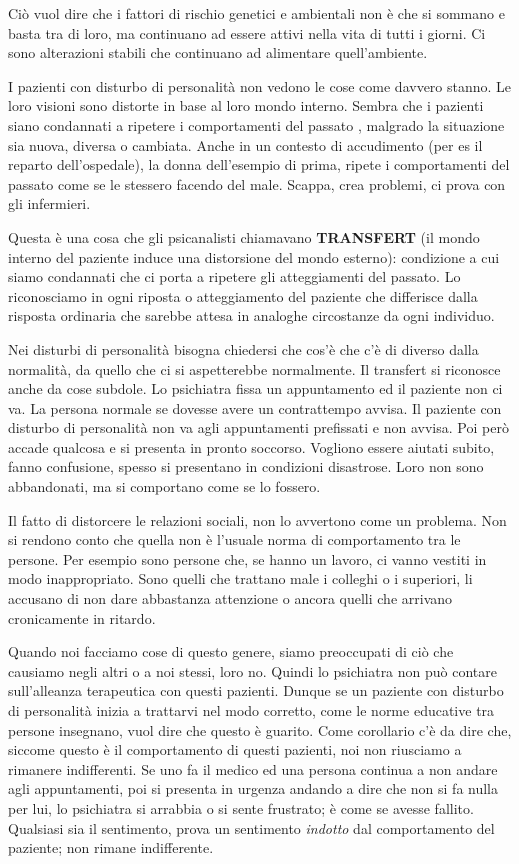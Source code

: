 Ciò vuol dire che i fattori di rischio genetici e ambientali non è che
si sommano e basta tra di loro, ma continuano ad essere attivi nella
vita di tutti i giorni. Ci sono alterazioni stabili che continuano ad
alimentare quell'ambiente.

I pazienti con disturbo di personalità non vedono le cose come davvero
stanno. Le loro visioni sono distorte in base al loro mondo interno.
Sembra che i pazienti siano condannati a ripetere i comportamenti del
passato , malgrado la situazione sia nuova, diversa o cambiata. Anche in
un contesto di accudimento (per es il reparto dell'ospedale), la donna
dell'esempio di prima, ripete i comportamenti del passato come se le
stessero facendo del male. Scappa, crea problemi, ci prova con gli
infermieri.

Questa è una cosa che gli psicanalisti chiamavano \textbf{TRANSFERT} (il
mondo interno del paziente induce una distorsione del mondo esterno):
condizione a cui siamo condannati che ci porta a ripetere gli
atteggiamenti del passato. Lo riconosciamo in ogni riposta o
atteggiamento del paziente che differisce dalla risposta ordinaria che
sarebbe attesa in analoghe circostanze da ogni individuo.

Nei disturbi di personalità bisogna chiedersi che cos'è che c'è di
diverso dalla normalità, da quello che ci si aspetterebbe normalmente.
Il transfert si riconosce anche da cose subdole. Lo psichiatra fissa un
appuntamento ed il paziente non ci va. La persona normale se dovesse
avere un contrattempo avvisa. Il paziente con disturbo di personalità
non va agli appuntamenti prefissati e non avvisa. Poi però accade
qualcosa e si presenta in pronto soccorso. Vogliono essere aiutati
subito, fanno confusione, spesso si presentano in condizioni disastrose.
Loro non sono abbandonati, ma si comportano come se lo fossero.

Il fatto di distorcere le relazioni sociali, non lo avvertono come un
problema. Non si rendono conto che quella non è l'usuale norma di
comportamento tra le persone. Per esempio sono persone che, se hanno un
lavoro, ci vanno vestiti in modo inappropriato. Sono quelli che trattano
male i colleghi o i superiori, li accusano di non dare abbastanza
attenzione o ancora quelli che arrivano cronicamente in ritardo.

Quando noi facciamo cose di questo genere, siamo preoccupati di ciò che
causiamo negli altri o a noi stessi, loro no. Quindi lo psichiatra non
può contare sull'alleanza terapeutica con questi pazienti. Dunque se un
paziente con disturbo di personalità inizia a trattarvi nel modo
corretto, come le norme educative tra persone insegnano, vuol dire che
questo è guarito. Come corollario c'è da dire che, siccome questo è il
comportamento di questi pazienti, noi non riusciamo a rimanere
indifferenti. Se uno fa il medico ed una persona continua a non andare
agli appuntamenti, poi si presenta in urgenza andando a dire che non si
fa nulla per lui, lo psichiatra si arrabbia o si sente frustrato; è come
se avesse fallito. Qualsiasi sia il sentimento, prova un sentimento
\emph{indotto} dal comportamento del paziente; non rimane indifferente.

